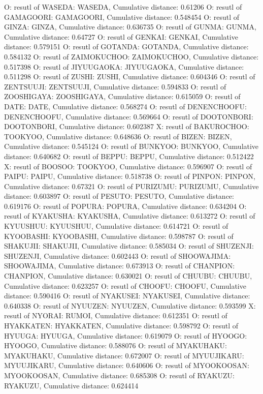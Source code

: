 O: resutl of WASEDA: WASEDA, Cumulative distance: 0.61206
O: resutl of GAMAGOORI: GAMAGOORI, Cumulative distance: 0.548454
O: resutl of GINZA: GINZA, Cumulative distance: 0.636735
O: resutl of GUNMA: GUNMA, Cumulative distance: 0.64727
O: resutl of GENKAI: GENKAI, Cumulative distance: 0.579151
O: resutl of GOTANDA: GOTANDA, Cumulative distance: 0.584132
O: resutl of ZAIMOKUCHOO: ZAIMOKUCHOO, Cumulative distance: 0.517398
O: resutl of JIYUUGAOKA: JIYUUGAOKA, Cumulative distance: 0.511298
O: resutl of ZUSHI: ZUSHI, Cumulative distance: 0.604346
O: resutl of ZENTSUUJI: ZENTSUUJI, Cumulative distance: 0.594833
O: resutl of ZOOSHIGAYA: ZOOSHIGAYA, Cumulative distance: 0.615059
O: resutl of DATE: DATE, Cumulative distance: 0.568274
O: resutl of DENENCHOOFU: DENENCHOOFU, Cumulative distance: 0.569664
O: resutl of DOOTONBORI: DOOTONBORI, Cumulative distance: 0.602387
X: resutl of BAKUROCHOO: TOOKYOO, Cumulative distance: 0.648636
O: resutl of BIZEN: BIZEN, Cumulative distance: 0.545124
O: resutl of BUNKYOO: BUNKYOO, Cumulative distance: 0.640682
O: resutl of BEPPU: BEPPU, Cumulative distance: 0.512422
X: resutl of BOOSOO: TOOKYOO, Cumulative distance: 0.596907
O: resutl of PAIPU: PAIPU, Cumulative distance: 0.518738
O: resutl of PINPON: PINPON, Cumulative distance: 0.67321
O: resutl of PURIZUMU: PURIZUMU, Cumulative distance: 0.603897
O: resutl of PESUTO: PESUTO, Cumulative distance: 0.619176
O: resutl of POPURA: POPURA, Cumulative distance: 0.634204
O: resutl of KYAKUSHA: KYAKUSHA, Cumulative distance: 0.613272
O: resutl of KYUUSHUU: KYUUSHUU, Cumulative distance: 0.614721
O: resutl of KYOOBASHI: KYOOBASHI, Cumulative distance: 0.598787
O: resutl of SHAKUJII: SHAKUJII, Cumulative distance: 0.585034
O: resutl of SHUZENJI: SHUZENJI, Cumulative distance: 0.602443
O: resutl of SHOOWAJIMA: SHOOWAJIMA, Cumulative distance: 0.673913
O: resutl of CHANPION: CHANPION, Cumulative distance: 0.630021
O: resutl of CHUUBU: CHUUBU, Cumulative distance: 0.623257
O: resutl of CHOOFU: CHOOFU, Cumulative distance: 0.590416
O: resutl of NYAKUSEI: NYAKUSEI, Cumulative distance: 0.640338
O: resutl of NYUUZEN: NYUUZEN, Cumulative distance: 0.593599
X: resutl of NYORAI: RUMOI, Cumulative distance: 0.612351
O: resutl of HYAKKATEN: HYAKKATEN, Cumulative distance: 0.598792
O: resutl of HYUUGA: HYUUGA, Cumulative distance: 0.619079
O: resutl of HYOOGO: HYOOGO, Cumulative distance: 0.588076
O: resutl of MYAKUHAKU: MYAKUHAKU, Cumulative distance: 0.672007
O: resutl of MYUUJIKARU: MYUUJIKARU, Cumulative distance: 0.640606
O: resutl of MYOOKOOSAN: MYOOKOOSAN, Cumulative distance: 0.685308
O: resutl of RYAKUZU: RYAKUZU, Cumulative distance: 0.624414
